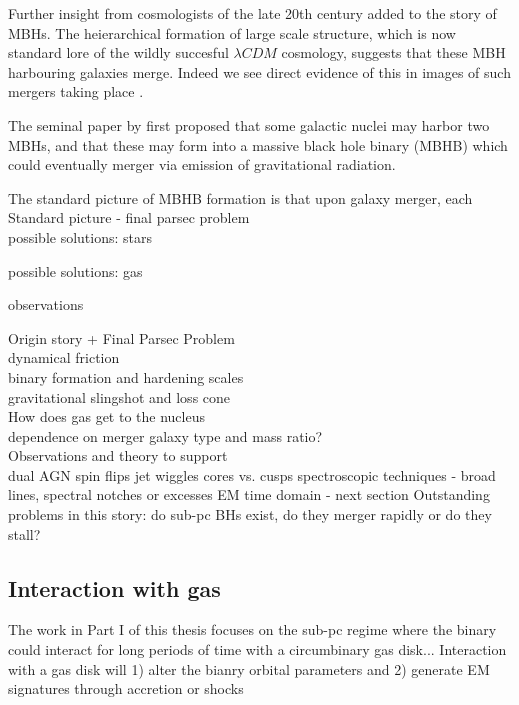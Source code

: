Further insight from cosmologists of the late 20th century added to the story of MBHs. The heierarchical formation of large scale structure, which is now standard lore of the wildly succesful $\lambda CDM$ \citep{LCDM} cosmology, suggests that these MBH harbouring galaxies merge. Indeed we see direct evidence of this in images of such mergers taking place \citep{}. 

The seminal paper by \cite{BBR:1980} first proposed that some galactic nuclei may harbor two MBHs, and that these may form into a massive black hole binary (MBHB) which could eventually merger via emission of gravitational radiation.

The standard picture of MBHB formation is that upon galaxy merger, each  
Standard picture - final parsec problem\\

possible solutions: stars

possible solutions: gas

observations

Origin story + Final Parsec Problem\\
	dynamical friction\\
	binary formation and hardening scales\\
	gravitational slingshot and loss cone\\
	How does gas get to the nucleus\\
	dependence on merger galaxy type and mass ratio?\\
	Observations and theory to support\\
		dual AGN
		spin flips
		jet wiggles
		cores vs. cusps
		spectroscopic techniques - broad lines, spectral notches or excesses
		EM time domain - next section
	Outstanding problems in this story:
		do sub-pc BHs exist, do they merger rapidly or do they stall?
	

\subsection{Interaction with gas}
The work in Part I of this thesis focuses on the sub-pc regime where the binary could interact for long periods of time with a circumbinary gas disk...
Interaction with a gas disk will 1) alter the bianry orbital parameters and 2) generate EM signatures through accretion or shocks

